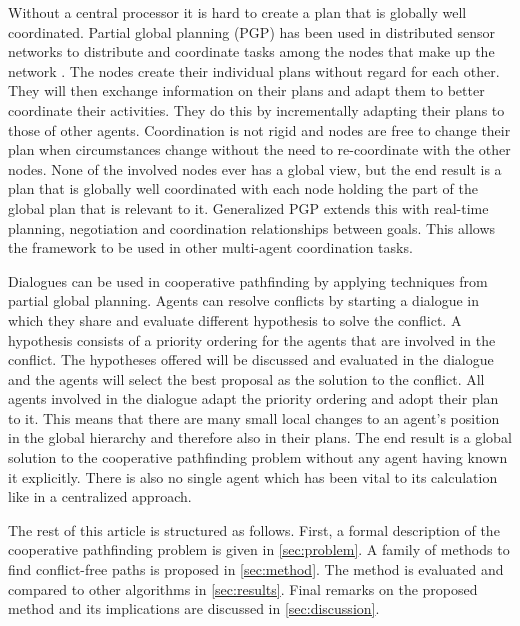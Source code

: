 Without a central processor it is hard to create a plan that is globally well
coordinated. Partial global planning (PGP) has been used in distributed sensor
networks to distribute and coordinate tasks among the nodes that make up the
network \citep[pp.~202--204]{durfee1991,woodridge2009}. The nodes create their 
individual plans without
regard for each other. They will then exchange information on their plans and
adapt them to better coordinate their activities. They do this by incrementally 
adapting their plans to those of other agents. Coordination is not rigid and
nodes are free to change their plan when circumstances change without the need 
to re-coordinate with the other nodes. None of the involved nodes ever has a 
global view, but the end result is a plan that is globally well
coordinated with each node holding the part of the global plan that is relevant
to it. Generalized PGP \cite{decker1992} extends this with real-time planning, 
negotiation and coordination relationships between goals. This allows the 
framework to be used in other multi-agent coordination tasks.

Dialogues can be used in cooperative pathfinding by applying techniques from
partial global planning. Agents can resolve conflicts by starting a dialogue in
which they share and evaluate different hypothesis to solve the conflict. A
hypothesis consists of a priority ordering for the agents that are involved in
the conflict. The hypotheses offered will be discussed and evaluated in the
dialogue and the agents will select the best proposal as the solution
to the conflict. All agents involved in the dialogue adapt the priority
ordering and adopt their plan to it. This means that there are many small local
changes to an agent's position in the global hierarchy and therefore also in
their plans. The end result is a global solution to the cooperative pathfinding
problem without any agent having known it explicitly. There is also no single
agent which has been vital to its calculation like in a centralized approach.

The rest of this article is structured as follows. First, a formal description
of the cooperative pathfinding problem is given in \autoref{sec:problem}.
A family of methods to find
conflict-free paths is proposed in \autoref{sec:method}. The method is
evaluated and compared to other algorithms in \autoref{sec:results}. Final
remarks on the proposed method and its implications are discussed in
\autoref{sec:discussion}.
